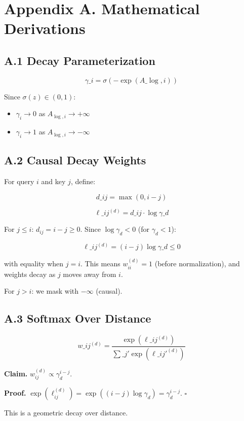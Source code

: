 \section{Appendix A. Mathematical Derivations}

\subsection{A.1 Decay Parameterization}

\[
\gamma\_i = \sigma(-\exp(A\_{\log, i}))
\tag{A.1}
\]

Since $\sigma(z) \in (0, 1)$:
\begin{itemize}
\item $\gamma_i \to 0$ as $A_{\log, i} \to +\infty$
\item $\gamma_i \to 1$ as $A_{\log, i} \to -\infty$

\end{itemize}
\subsection{A.2 Causal Decay Weights}

For query $i$ and key $j$, define:

\[
d\_{ij} = \max(0, i - j)
\tag{A.2}
\]

\[
\ell\_{ij}^{(d)} = d\_{ij} \cdot \log \gamma\_d
\tag{A.3}
\]

For $j \leq i$: $d_{ij} = i - j \geq 0$. Since $\log \gamma_d < 0$ 
(for $\gamma_d < 1$):

\[
\ell\_{ij}^{(d)} = (i - j) \log \gamma\_d \leq 0
\tag{A.4}
\]

with equality when $j = i$. This means $w_{ii}^{(d)} = 1$ (before 
normalization), and weights decay as $j$ moves away from $i$.

For $j > i$: we mask with $-\infty$ (causal).

\subsection{A.3 Softmax Over Distance}

\[
w\_{ij}^{(d)} = \frac{\exp(\ell\_{ij}^{(d)})}{\sum\_{j'} \exp(\ell\_{ij'}^{(d)})}
\tag{A.5}
\]

\textbf{Claim.} $w_{ij}^{(d)} \propto \gamma_d^{i - j}$.

\textbf{Proof.} $\exp(\ell_{ij}^{(d)}) = \exp((i-j) \log \gamma_d) = \gamma_d^{i-j}$. 
$\square$

This is a geometric decay over distance.

